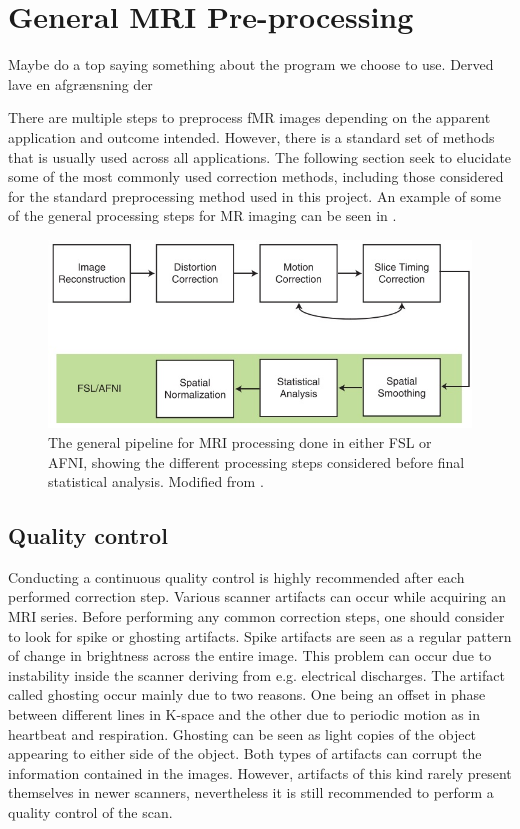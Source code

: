 

\section{General MRI Pre-processing}
Maybe do a top saying something about the program we choose to use. Derved lave en afgrænsning der 


There are multiple steps to preprocess fMR images depending on the apparent application and outcome intended. However, there is a standard set of methods that is usually used across all applications. The following section seek to elucidate some of the most commonly used correction methods, including those considered for the standard preprocessing method used in this project. An example of some of the general processing steps for MR imaging can be seen in . \cite{Poldrack2011} 

\begin{figure}[H]                 
	\includegraphics[width=.8\textwidth]{figures/aBackground/processing}  
	\caption{The general pipeline for MRI processing done in either FSL or AFNI, showing the different processing steps considered before final statistical analysis. Modified from \cite{Poldrack2011}.}
	\label{fig:back:pipeline} 
\end{figure}


\subsection{Quality control}
Conducting a continuous quality control is highly recommended after each performed correction step. Various scanner artifacts can occur while acquiring an MRI series. Before performing any common correction steps, one should consider to look for spike or ghosting artifacts. Spike artifacts are seen as a regular pattern of change in brightness across the entire image. This problem can occur due to instability inside the scanner deriving from e.g. electrical discharges.  
The artifact called ghosting occur mainly due to two reasons. One being an offset in phase between different lines in K-space and the other due to periodic motion as in heartbeat and respiration. Ghosting can be seen as light copies of the object appearing to either side of the object. Both types of artifacts can corrupt the information contained in the images. However, artifacts of this kind rarely present themselves in newer scanners, nevertheless it is still recommended to perform a quality control of the scan. \cite{Poldrack2011}

